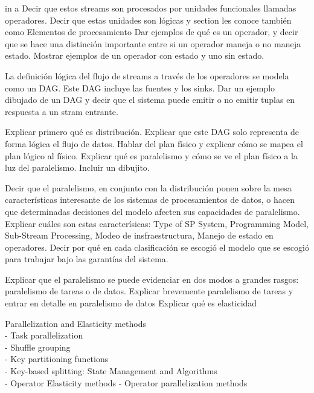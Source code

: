   in a Decir que estos streams son
  procesados por unidades funcionales llamadas operadores. Decir que estas
  unidades son lógicas y section les conoce también como Elementos de
  procesamiento \cite{kamburugamuve2013survey} Dar ejemplos de qué es un
  operador, y decir que se hace una distinción importante entre si un operador
  maneja o no maneja estado. Mostrar ejemplos de un operador con estado y uno
  sin estado.
  \cite{KottoKombi2015ParallelAD}

  La definición lógica del flujo de streams a través de los operadores se
  modela como un DAG. Este DAG incluye las fuentes y los sinks. Dar un ejemplo
  dibujado de un DAG y decir que el sistema puede emitir o no emitir tuplas en
  respuesta a un stram entrante.

  Explicar primero qué es distribución. Explicar que este DAG solo representa
  de forma lógica el flujo de datos. Hablar del plan físico y explicar cómo se
  mapea el plan lógico al físico. Explicar qué es paralelismo y cómo se ve el
  plan físico a la luz del paralelismo. Incluir un dibujito.
  \cite{kamburugamuve2013survey}

  Decir que el paralelismo, en conjunto con la distribución ponen sobre la mesa
  características interesante de los sistemas de procesamientos de datos, o
  hacen que determinadas decisiones del modelo afecten sus capacidades de
  paralelismo. Explicar cuáles son estas caracterísicas: Type of SP System,
  Programming Model, Sub-Stream Processing, Modeo de insfraestructura, Manejo
  de estado en operadores. \cite{R_ger_2019} Decir por qué en cada
  clasificación se escogió el modelo que se escogió para trabajar bajo las
  garantías del sistema.

  Explicar que el paralelismo se puede evidenciar en dos modos a grandes
  rasgos: paralelismo de tareas o de datos. Explicar brevemente paralelismo de
  tareas y entrar en detalle en paralelismo de datos
  Explicar qué es elasticidad

  Parallelization and Elasticity methods \cite{R_ger_2019}\\
  - Task parallelization \cite{R_ger_2019}\\
  - Shuffle grouping \cite{R_ger_2019}\\
  - Key partitioning functions \cite{R_ger_2019}\\
  - Key-based splitting: State Management and Algorithms \cite{R_ger_2019}\\
  - Operator Elasticity methods \cite{R_ger_2019}
  - Operator parallelization methods \cite{R_ger_2019}

